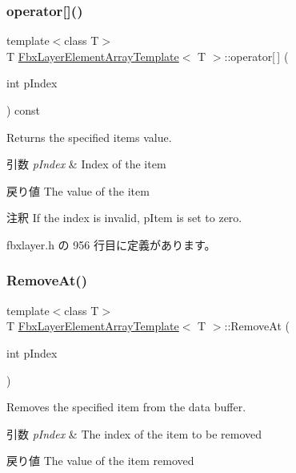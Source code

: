 \subsubsection{\texorpdfstring{operator[]()}{operator[]()}}
{\footnotesize\ttfamily template$<$class T$>$ \\
T \hyperlink{class_fbx_layer_element_array_template}{Fbx\+Layer\+Element\+Array\+Template}$<$ T $>$\+::operator\mbox{[}$\,$\mbox{]} (\begin{DoxyParamCaption}\item[{int}]{p\+Index }\end{DoxyParamCaption}) const\hspace{0.3cm}{\ttfamily [inline]}}

Returns the specified item\textquotesingle{}s value. 
\begin{DoxyParams}{引数}
{\em p\+Index} & Index of the item \\
\hline
\end{DoxyParams}
\begin{DoxyReturn}{戻り値}
The value of the item 
\end{DoxyReturn}
\begin{DoxyRemark}{注釈}
If the index is invalid, p\+Item is set to zero. 
\end{DoxyRemark}


 fbxlayer.\+h の 956 行目に定義があります。

\mbox{\label{class_fbx_layer_element_array_template_a2ebd201d3d664e9b171d50561bfad1de}} 
\subsubsection{\texorpdfstring{Remove\+At()}{RemoveAt()}}
{\footnotesize\ttfamily template$<$class T$>$ \\
T \hyperlink{class_fbx_layer_element_array_template}{Fbx\+Layer\+Element\+Array\+Template}$<$ T $>$\+::Remove\+At (\begin{DoxyParamCaption}\item[{int}]{p\+Index }\end{DoxyParamCaption})\hspace{0.3cm}{\ttfamily [inline]}}

Removes the specified item from the data buffer. 
\begin{DoxyParams}{引数}
{\em p\+Index} & The index of the item to be removed \\
\hline
\end{DoxyParams}
\begin{DoxyReturn}{戻り値}
The value of the item removed 
\end{DoxyReturn}


